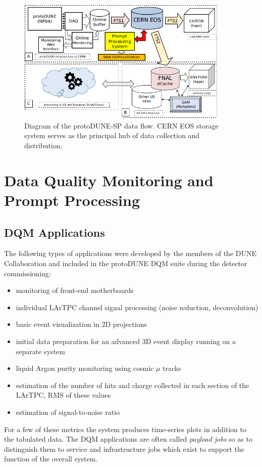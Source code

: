 \documentclass{webofc}
\newcommand{\pd}{protoDUNE\xspace}
\begin{document}
\begin{figure}[tb]
\centering\includegraphics[width=0.9\textwidth]{figures/protoDUNE_data_flow_2018_v1.png}
\caption{\label{fig:dataflow}Diagram of the protoDUNE-SP data flow. CERN EOS storage system serves as the principal hub of data collection and distribution.}
\end{figure}


\section{Data Quality Monitoring and Prompt Processing}
\subsection{DQM Applications}
The following types of applications were developed by the members of the DUNE Collaboration and
included in the \pd DQM suite during the detector
commissioning:
\begin{itemize}
\item monitoring of front-end motherboards
\item individual LArTPC channel signal processing (noise reduction, deconvolution)
\item basic event visualization in 2D projections
\item initial data preparation for an advanced 3D event display running on a separate system
\item liquid Argon purity monitoring using cosmic $\mu$ tracks
\item estimation of the number of hits and charge collected in each section of the LArTPC, RMS of these values
\item estimation of signal-to-noise ratio
\end{itemize}

\noindent For a few of these metrics the system produces time-series plots in addition to the tabulated data.
The DQM applications are often called \textit{payload jobs} so as to distinguish
them to service and infrastructure jobs which exist to support the function of the overall system.
\end{document}
